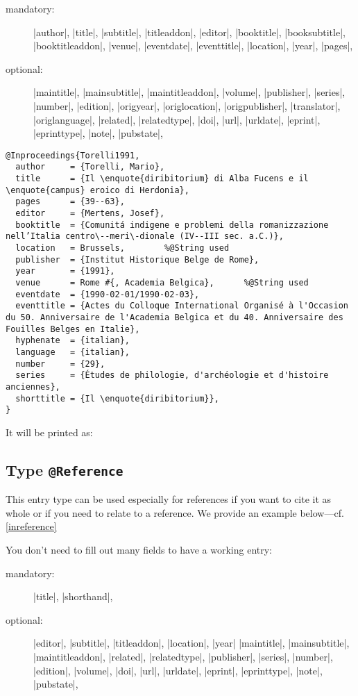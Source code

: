 \documentclass[a4paper,
10pt,
greek,
french,
spanish,
italian,
ngerman,
english
]{ltxdoc}
\begin{document}
\begin{description}
\item[mandatory:] 
|author|, |title|, |subtitle|, |titleaddon|,
|editor|,  |booktitle|, |booksubtitle|, |booktitleaddon|,
|venue|, |eventdate|, |eventtitle|,
|location|, |year|, |pages|, 
\item[optional:]
|maintitle|, |mainsubtitle|, |maintitleaddon|, |volume|, 
|publisher|, |series|, |number|, |edition|, 
|origyear|, |origlocation|, |origpublisher|, 
|translator|, |origlanguage|,
|related|, |relatedtype|,
|doi|, |url|, |urldate|, |eprint|, |eprinttype|, |note|, |pubstate|, 
\end{description}
 
 
 
 \begin{lstlisting}[style=bibentry,label=Torelli1991,caption={{@}Inproceedings\{Torelli1991,…\} }]
@Inproceedings{Torelli1991,
  author     = {Torelli, Mario},
  title      = {Il \enquote{diribitorium} di Alba Fucens e il \enquote{campus} eroico di Herdonia},
  pages      = {39--63},
  editor     = {Mertens, Josef},
  booktitle  = {Comunitá indigene e problemi della romanizzazione nell’Italia centro\--meri\-dionale (IV--III sec. a.C.)},
  location   = Brussels, 		%@String used
  publisher  = {Institut Historique Belge de Rome},
  year       = {1991},
  venue      = Rome #{, Academia Belgica},		%@String used
  eventdate  = {1990-02-01/1990-02-03},
  eventtitle = {Actes du Colloque International Organisé à l'Occasion du 50. Anniversaire de l'Academia Belgica et du 40. Anniversaire des Fouilles Belges en Italie},
  hyphenate  = {italian},
  language   = {italian},
  number     = {29},
  series     = {Études de philologie, d'archéologie et d'histoire anciennes},
  shorttitle = {Il \enquote{diribitorium}},
}
\end{lstlisting}
It will be printed as:
 

 \subsection{Type \texttt{@Reference}}\label{reference}
 This entry type can be used especially for references if you want to cite it as whole or if you need to relate to a reference. 
We provide an example below---cf. \cref{inreference}

You don’t need to fill out many fields to have a working entry:
\begin{description}
\item[mandatory:] |title|, |shorthand|,
\item[optional:] 
 |editor|, |subtitle|, |titleaddon|,
 |location|, |year|
|maintitle|, |mainsubtitle|, |maintitleaddon|,
|related|, |relatedtype|,
|publisher|, |series|, |number|, |edition|, |volume|,
|doi|, |url|, |urldate|, |eprint|, |eprinttype|, |note|, |pubstate|, 
\end{description}
\end{document}
